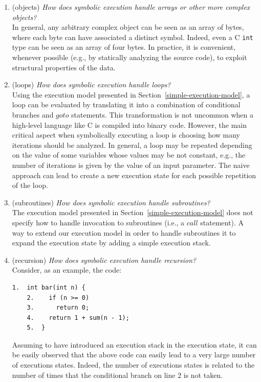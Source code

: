 \begin{enumerate}

  \item (objects) {\em How does symbolic execution handle arrays or other more complex objects?} \\
  In general, any arbitrary complex object can be seen as an array of bytes, where each byte can have associated a distinct symbol. Indeed, even a C {\tt int} type can be seen as an array of four bytes. In practice, it is convenient, whenever possible (e.g., by statically analyzing the source code), to exploit structural properties of the data. 

  \item (loops) {\em How does symbolic execution handle loops?} \\
  Using the execution model presented in Section~\ref{simple-execution-model}, a loop can be evaluated by translating it into a combination of conditional branches and $goto$ statements. This transformation is not uncommon when a high-level language like C is compiled into binary code. However, the main critical aspect when symbolically executing a loop is choosing how many iterations should be analyzed. In general, a loop may be repeated depending on the value of some variables whose values may be not constant, e.g., the number of iterations is given by the value of an input parameter. The naive approach can lead to create a new execution state for each possible repetition of the loop.

  \item (subroutines) {\em How does symbolic execution handle subroutines?} \\
  The execution model presented in Section~\ref{simple-execution-model} does not specify how to handle invocation to subroutines (i.e., a $call$ statement). A way to extend our execution model in order to handle subroutines it to expand the execution state by adding a simple execution stack.

  \item (recursion) {\em How does symbolic execution handle recursion?} \\
  Consider, as an example, the code:
    \begin{lstlisting}[basicstyle=\ttfamily\small]
    1.  int bar(int n) {
    2.    if (n >= 0) 
    3.      return 0;
    4.    return 1 + sum(n - 1);
    5.  }
    \end{lstlisting}
  Assuming to have introduced an execution stack in the execution state, it can be easily observed that the above code can easily lead to a very large number of executions states. Indeed, the number of executions states is related to the number of times that the conditional branch on line 2 is not taken. 


\end{enumerate}
